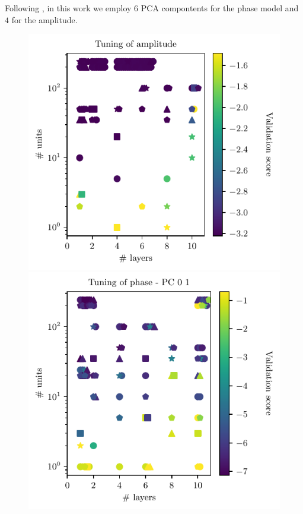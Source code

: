 \documentclass[twocolumn,showpacs,preprintnumbers,nofootinbib,prd,
superscriptaddress,10pt]{revtex4-1}
\begin{document}
Following \cite{Schmidt:2020yuu}, in this work we employ $6$ PCA compontents for the phase model and $4$ for the amplitude.

\begin{figure}[t]
	\begin{multicols}
		\centering
		\includegraphics[scale = 0.9]{tuning_amp}\hfill
		\includegraphics[scale = 0.9]{tuning_ph_01}

\end{multicols}
\end{figure}
\end{document}
